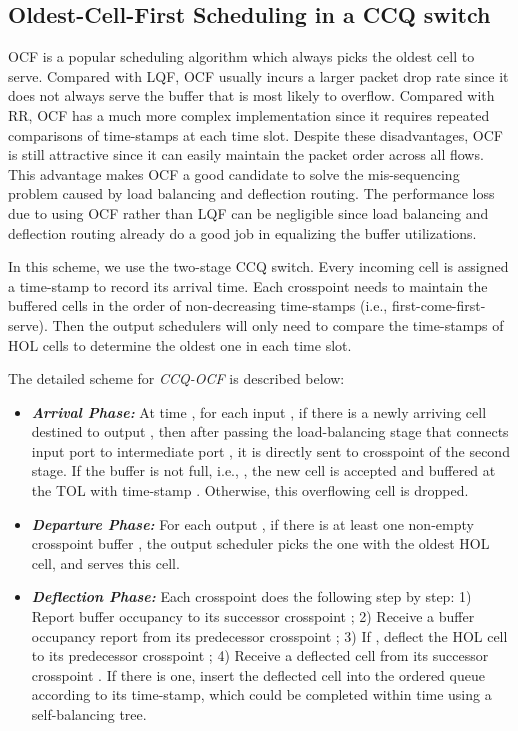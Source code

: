 \documentclass[journal,final,doublecolumn,10pt,twoside]{IEEEtranTCOM} \normalsize
\begin{document}
\subsection{Oldest-Cell-First Scheduling in a CCQ switch}
\label{sec:OCF}

OCF is a popular scheduling algorithm which always picks the oldest cell to serve. Compared with LQF, OCF usually incurs a larger packet drop rate since it does not always serve the buffer that is most likely to overflow. Compared with RR, OCF has a much more complex implementation since it requires repeated comparisons of time-stamps at each time slot. Despite these disadvantages, OCF is still attractive since it can easily maintain the packet order across all flows. This advantage makes OCF a good candidate to solve the mis-sequencing problem caused by load balancing and deflection routing. The performance loss due to using OCF rather than LQF can be negligible since load balancing and deflection routing already do a good job in equalizing the buffer utilizations.

In this scheme, we use the two-stage CCQ switch. Every incoming cell is assigned a time-stamp to record its arrival time. Each crosspoint needs to maintain the buffered cells in the order of non-decreasing time-stamps (i.e., first-come-first-serve). Then the output schedulers will only need to compare the time-stamps of HOL cells to determine the oldest one in each time slot.


The detailed scheme for \emph{CCQ-OCF} is described below:
\begin{itemize}
\item
\textbf{\emph{Arrival Phase:}} 
At time , for each input , if there is a newly arriving cell destined to output , then after passing the load-balancing stage that connects input port  to intermediate port , it is directly sent to crosspoint  of the second stage. If the buffer is not full, i.e., , the new cell is accepted and buffered at the TOL with time-stamp . Otherwise, this overflowing cell is dropped.

\item
\textbf{\emph{Departure Phase:}} 
For each output , if there is at least one non-empty crosspoint buffer , the output scheduler picks the one with the oldest HOL cell, and serves this cell.

\item
\textbf{\emph{Deflection Phase:}} 
Each crosspoint  does the following step by step:
1) Report buffer occupancy  to its successor crosspoint ;
2) Receive a buffer occupancy report  from its predecessor crosspoint ;
3) If , deflect the HOL cell to its predecessor crosspoint ;
4) Receive a deflected cell from its successor crosspoint . If there is one, insert the deflected cell into the ordered queue according to its time-stamp, which could be completed within  time using a self-balancing tree.

\end{itemize}
\end{document}
